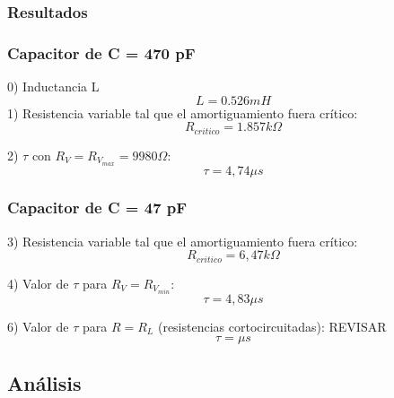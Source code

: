 \documentclass{article}
\begin{document}
            
        \subsubsection{Resultados}

            \subsubsection*{Capacitor de C = 470 pF}
                0) Inductancia L
                \begin{equation}
                    L=0.526mH
                \end{equation}
                1) Resistencia variable tal que el amortiguamiento fuera crítico:
                \begin{equation}
                    R_{critico} = 1.857 k\Omega
                \end{equation} \par
                2) $ \tau $ con $ R_V = R_{V_{max}} = 9980 \Omega $:
                 \begin{equation}
                    \tau = 4,74 \mu s 
                \end{equation}

            \subsubsection*{Capacitor de C = 47 pF}
                3) Resistencia variable tal que el amortiguamiento fuera crítico:
                \begin{equation}
                    R_{critico} = 6,47 k\Omega 
                \end{equation} \par
                4) Valor de $ \tau $ para $ R_V = R_{V_{min}} $: 
                \begin{equation}
                    \tau = 4,83 \mu s 
                \end{equation} \par
                6) Valor de $ \tau $ para $ R = R_L $ (resistencias cortocircuitadas): REVISAR
                \begin{equation}
                    \tau =  \mu s 
                \end{equation}
        


    \subsection{Análisis}
    
\end{document}
